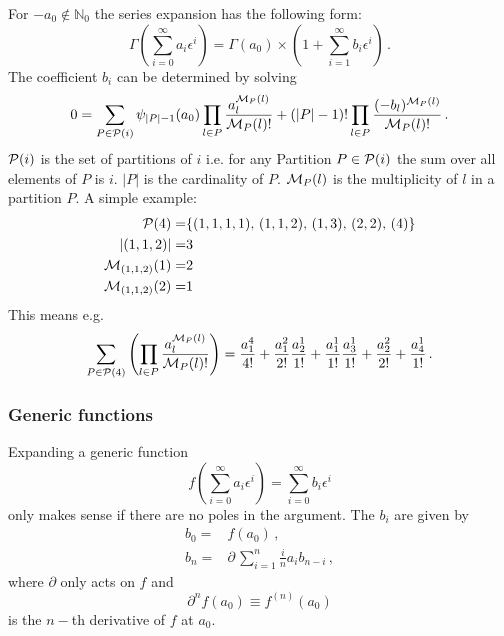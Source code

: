 \documentclass{article}
\begin{document}
For $-a_0 \notin \mathbb{N}_0$ the series expansion has the following
form:
\begin{equation}
  \label{eq:gamma}
  \Gamma\left(\sum_{i=0}^\infty a_i\epsilon^i\right) =
  \Gamma(a_0)\times\left(1+\sum_{i=1}^\infty b_i\epsilon^i\right)\,.
\end{equation}
The coefficient $b_i$ can be determined by solving
\begin{equation}
  \label{eq:gamma_rec}
  0 = \sum_{P \in \mathcal{P}(i)} \psi_{|P|-1}(a_0)\prod_{l\in
    P}\frac{a_l^{{\cal M}_P(l)}}{{\cal M}_P(l)!}
+ (|P|-1)!\*\prod_{l \in P}\frac{(-b_l)^{{\cal M}_P(l)}}{{\cal M}_P(l)!}\,.
\end{equation}
${\cal P}(i)$ is the set of partitions of $i$ i.e. for any
Partition $P \in {\cal P}(i)$ the sum over all elements of $P$ is
$i$. $|P|$ is the cardinality of $P$.
${\cal M}_P(l)$ is the multiplicity of $l$ in a partition $P$. A simple
example:
\begin{align*}
  {\cal P}(4)=&\{(1,1,1,1),\,(1,1,2),\,(1,3),\,(2,2),\,(4)\}\\
  |(1,1,2)|=&3\\
  {\cal M}_{(1,1,2)}(1)=&2\\
  {\cal M}_{(1,1,2)}(2)=&1\\
\end{align*}
This means e.g.
\begin{equation}
  \label{eq:exp_ex}
\sum_{P \in {\cal P}(4)} \left(\prod_{l \in P} \frac{a^{{\cal M}_P(l)}_l}{{\cal M}_P(l)!} \right)=
  \frac{a_1^4}{4!}+\frac{a_1^2}{2!}\frac{a_2^1}{1!}+\frac{a_1^1}{1!}\frac{a_3^1}{1!}+\frac{a_2^2}{2!}+\frac{a_4^1}{1!}\,.
\end{equation}


\subsubsection{Generic functions}
\label{sec:generic_fun}

Expanding a generic function
\begin{equation}
  \label{eq:generic_fun}
  f\left(\sum_{i=0}^{\infty}a_i
    \epsilon^i\right)=\sum_{i=0}^{\infty}b_i
    \epsilon^i
\end{equation}
only makes sense if there are no poles in the argument.
The $b_i$ are given by
\begin{align}
  \label{eq:generic_rec}
  b_0=&f(a_0)\,,\\
  b_n=&\partial\,\sum_{i=1}^{n}\frac{i}{n} a_{i}b_{n-i} \,,
\end{align}
where $\partial$ only acts on $f$ and
\begin{equation}
  \label{eq:partial}
  \partial^n f(a_0) \equiv f^{(n)}(a_0)
\end{equation}
is the $n-$th derivative of $f$ at $a_0$.
\end{document}
